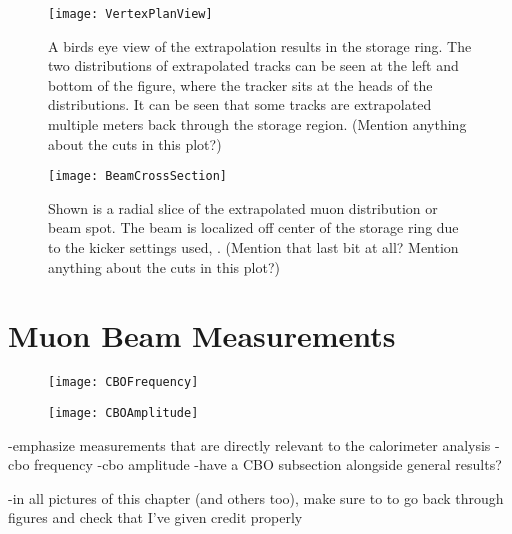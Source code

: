 \begin{figure}[]
    \centering
    \texttt{[image: VertexPlanView]}
    \caption[Birds eye view of extrapolation in ring]{A birds eye view of the extrapolation results in the storage ring. The two distributions of extrapolated tracks can be seen at the left and bottom of the figure, where the tracker sits at the heads of the distributions. It can be seen that some tracks are extrapolated multiple meters back through the storage region. (Mention anything about the cuts in this plot?)}    
    \label{fig:VertexPlanView}
\end{figure}

\begin{figure}[]
  \centering
  \texttt{[image: BeamCrossSection]}
    \caption[Extrapolated muon beam distribution cross-section]{Shown is a radial slice of the extrapolated muon distribution or beam spot. The beam is localized off center of the storage ring due to the kicker settings used, . (Mention that last bit at all? Mention anything about the cuts in this plot?)}
    \label{fig:BeamCrossSection}
\end{figure}








\section{Muon Beam Measurements}
\label{sec:MuonBeamMeasurements}


\begin{figure}[]
    \centering
    \texttt{[image: CBOFrequency]}
    \caption[CBO frequency]{}    
    \label{fig:CBOFrequency}
\end{figure}

\begin{figure}[]
    \centering
    \texttt{[image: CBOAmplitude]}
    \caption[CBO amplitude]{}    
    \label{fig:CBOAmplitude}
\end{figure}

-emphasize measurements that are directly relevant to the calorimeter \wa analysis
-cbo frequency
-cbo amplitude
-have a CBO subsection alongside general results? 






-in all pictures of this chapter (and others too), make sure to to go back through figures and check that I've given credit properly



